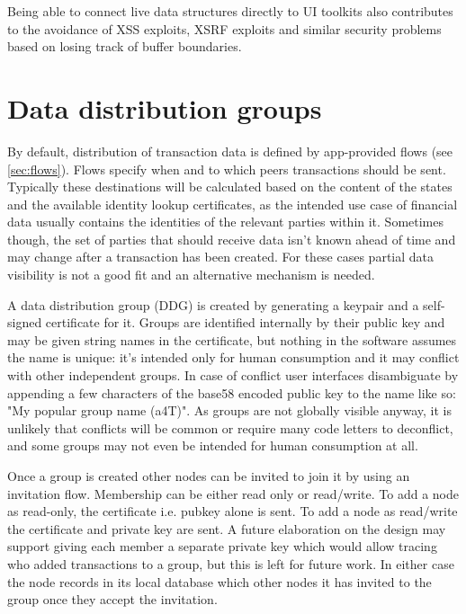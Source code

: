\documentclass{article}
\begin{document}
Being able to connect live data structures directly to UI toolkits also contributes to the avoidance
of XSS exploits, XSRF exploits and similar security problems based on losing track of buffer boundaries.

\section{Data distribution groups}

By default, distribution of transaction data is defined by app-provided flows (see \cref{sec:flows}). Flows specify
when and to which peers transactions should be sent. Typically these destinations will be calculated based on the content
of the states and the available identity lookup certificates, as the intended use case of financial data usually
contains the identities of the relevant parties within it. Sometimes though, the set of parties that should receive
data isn't known ahead of time and may change after a transaction has been created. For these cases partial data
visibility is not a good fit and an alternative mechanism is needed.

A data distribution group (DDG) is created by generating a keypair and a self-signed certificate for it. Groups are
identified internally by their public key and may be given string names in the certificate, but nothing in the
software assumes the name is unique: it's intended only for human consumption and it may conflict with other independent
groups. In case of conflict user interfaces disambiguate by appending a few characters of the base58 encoded public key
to the name like so:  "My popular group name (a4T)". As groups are not globally visible anyway, it is unlikely that
conflicts will be common or require many code letters to deconflict, and some groups may not even be intended for
human consumption at all.

Once a group is created other nodes can be invited to join it by using an invitation flow. Membership can be either
read only or read/write. To add a node as read-only, the certificate i.e. pubkey alone is sent. To add a node as
read/write the certificate and private key are sent. A future elaboration on the design may support giving each member a
separate private key which would allow tracing who added transactions to a group, but this is left for future work.
In either case the node records in its local database which other nodes it has invited to the group once they accept
the invitation.
\end{document}
